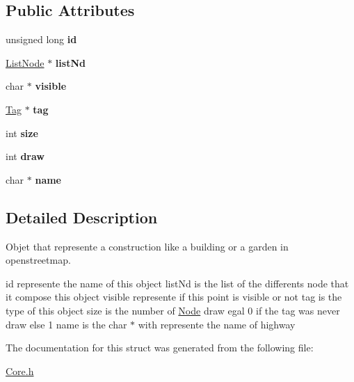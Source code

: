 \subsection*{Public Attributes}
\begin{DoxyCompactItemize}
\item 
\hypertarget{structWay_a1cca095d0625e82d6bfb36dd1d46640f}{unsigned long {\bfseries id}}\label{structWay_a1cca095d0625e82d6bfb36dd1d46640f}

\item 
\hypertarget{structWay_acac0fa32ab84a83dd2797fb255a4fe1a}{\hyperlink{structListNode}{List\-Node} $\ast$ {\bfseries list\-Nd}}\label{structWay_acac0fa32ab84a83dd2797fb255a4fe1a}

\item 
\hypertarget{structWay_a1eb964f25274018f981f08292cb221bb}{char $\ast$ {\bfseries visible}}\label{structWay_a1eb964f25274018f981f08292cb221bb}

\item 
\hypertarget{structWay_a0941af436e8c52be813a29f02f0eb987}{\hyperlink{structTag}{Tag} $\ast$ {\bfseries tag}}\label{structWay_a0941af436e8c52be813a29f02f0eb987}

\item 
\hypertarget{structWay_a51e8d4755a7e591657d7e70f34984af0}{int {\bfseries size}}\label{structWay_a51e8d4755a7e591657d7e70f34984af0}

\item 
\hypertarget{structWay_a9bbbf5fb49a0c87e2672dad52d845839}{int {\bfseries draw}}\label{structWay_a9bbbf5fb49a0c87e2672dad52d845839}

\item 
\hypertarget{structWay_adedae7524ea19d540ad71fa905729697}{char $\ast$ {\bfseries name}}\label{structWay_adedae7524ea19d540ad71fa905729697}

\end{DoxyCompactItemize}


\subsection{Detailed Description}
Objet that represente a construction like a building or a garden in openstreetmap. 

id represente the name of this object list\-Nd is the list of the differents node that it compose this object visible represente if this point is visible or not tag is the type of this object size is the number of \hyperlink{structNode}{Node} draw egal 0 if the tag was never draw else 1 name is the char $\ast$ with represente the name of highway 

The documentation for this struct was generated from the following file\-:\begin{DoxyCompactItemize}
\item 
\hyperlink{Core_8h}{Core.\-h}\end{DoxyCompactItemize}
